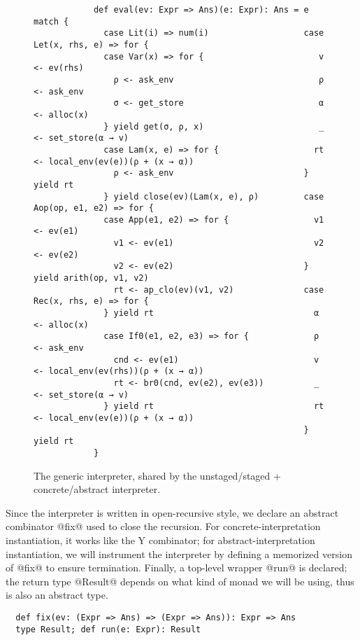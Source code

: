 \vspace{-1em}
\begin{figure}[h!]
  \centering
  \begin{lstlisting}
            def eval(ev: Expr => Ans)(e: Expr): Ans = e match {
              case Lit(i) => num(i)                   case Let(x, rhs, e) => for {
              case Var(x) => for {                       v <- ev(rhs)
                ρ <- ask_env                             ρ <- ask_env
                σ <- get_store                           α <- alloc(x)
              } yield get(σ, ρ, x)                       _ <- set_store(α → v)
              case Lam(x, e) => for {                   rt <- local_env(ev(e))(ρ + (x → α))
                ρ <- ask_env                          } yield rt
              } yield close(ev)(Lam(x, e), ρ)         case Aop(op, e1, e2) => for {
              case App(e1, e2) => for {                 v1 <- ev(e1)                                               
                v1 <- ev(e1)                            v2 <- ev(e2)
                v2 <- ev(e2)                          } yield arith(op, v1, v2)
                rt <- ap_clo(ev)(v1, v2)              case Rec(x, rhs, e) => for {
              } yield rt                                α <- alloc(x)
              case If0(e1, e2, e3) => for {             ρ <- ask_env
                cnd <- ev(e1)                           v <- local_env(ev(rhs))(ρ + (x → α))
                rt <- br0(cnd, ev(e2), ev(e3))          _ <- set_store(α → v)
              } yield rt                                rt <- local_env(ev(e))(ρ + (x → α))
                                                      } yield rt                    
            }
  \end{lstlisting}
\caption{The generic interpreter,
  shared by the unstaged/staged + concrete/abstract interpreter.}
\label{fig:shared_int}
\end{figure}
\vspace{-1em}

Since the interpreter is written in open-recursive style, we declare an abstract
combinator @fix@ used to close the recursion. For concrete-interpretation instantiation, it
works like the Y combinator; for abstract-interpretation instantiation, we will
instrument the interpreter by defining a memorized version of @fix@ to ensure
termination. Finally, a top-level wrapper @run@ is declared; the return type
@Result@ depends on what kind of monad we will be using, thus is also an abstract type.

\begin{lstlisting}
  def fix(ev: (Expr => Ans) => (Expr => Ans)): Expr => Ans
  type Result; def run(e: Expr): Result
\end{lstlisting}

